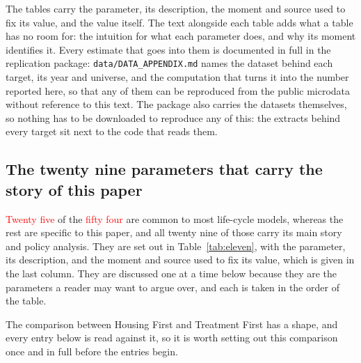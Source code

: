 \documentclass[10pt]{article}
\begin{document}
The tables carry the parameter, its description, the moment and source used to
fix its value, and the value itself. The text alongside each table adds what a table
has no room for: the intuition for what each parameter does, and why its moment
identifies it. Every estimate that goes into them is documented in full in the
replication package: \texttt{data/DATA\_APPENDIX.md} names the dataset behind each
target, its year and universe, and the computation that turns it into the number
reported here, so that any of them can be reproduced from the public microdata
without reference to this text. The package also carries the datasets
themselves, so nothing has to be downloaded to reproduce any of this: the extracts
behind every target sit next to the code that reads them.

\subsection{The twenty nine parameters that carry the story of this paper}

\textcolor{red}{Twenty five} of the \textcolor{red}{fifty four} are common to most life-cycle models, whereas the rest are specific to this paper, and all twenty nine of those carry its main story and policy analysis. They are set out in Table~\ref{tab:eleven},
with the parameter, its description,
and the moment and source used to fix its value, which is given in the last
column. They are discussed one at a time below because they are the parameters a
reader may want to argue over, and each is taken in the order of the table.

The comparison between Housing First and Treatment First has a shape,
and every entry below is read against it, so it is worth setting out this
comparison once and in full before the entries begin.
\end{document}
